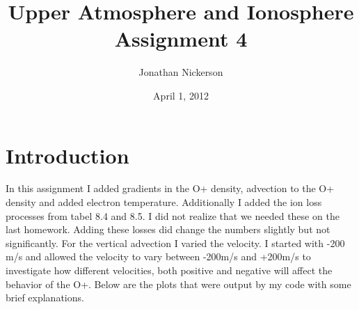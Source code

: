 \documentclass[10pt]{article}
\begin{document}
\title{Upper Atmosphere and Ionosphere Assignment 4}
\author{Jonathan Nickerson}
\date{April 1, 2012}
\maketitle

\section{Introduction}
In this assignment I added gradients in the O+ density, advection to the O+ density and added electron temperature. Additionally I added the ion loss processes from tabel 8.4 and 8.5. I did not realize that we needed these on the last homework. Adding these losses did change the numbers slightly but not significantly. For the vertical advection I varied the velocity. I started with -200 m/s and allowed the velocity to vary between -200m/s and +200m/s to investigate how different velocities, both positive and negative will affect the behavior of the O+. Below are the plots that were output by my code with some brief explanations.
\end{document}

